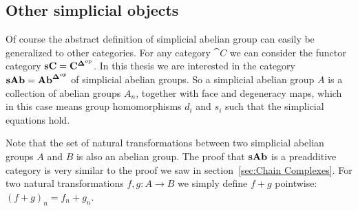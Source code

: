 
\subsection{Other simplicial objects}
Of course the abstract definition of simplicial abelian group can easily be generalized to other categories. For any category $\cat{C}$ we can consider the functor category $\mathbf{sC} = \mathbf{C}^{\mathbf{\Delta}^{op}}$. In this thesis we are interested in the category $\mathbf{sAb} = \mathbf{Ab}^{\mathbf{\Delta}^{op}}$ of simplicial abelian groups. So a simplicial abelian group $A$ is a collection of abelian groups $A_n$, together with face and degeneracy maps, which in this case means group homomorphisms $d_i$ and $s_i$ such that the simplicial equations hold.

Note that the set of natural transformations between two simplicial abelian groups $A$ and $B$ is also an abelian group. The proof that $\mathbf{sAb}$ is a preadditive category is very similar to the proof we saw in section~\ref{sec:Chain Complexes}. For two natural transformations $f,g: A \to B$ we simply define $f+g$ pointwise: $(f+g)_n = f_n + g_n$.

